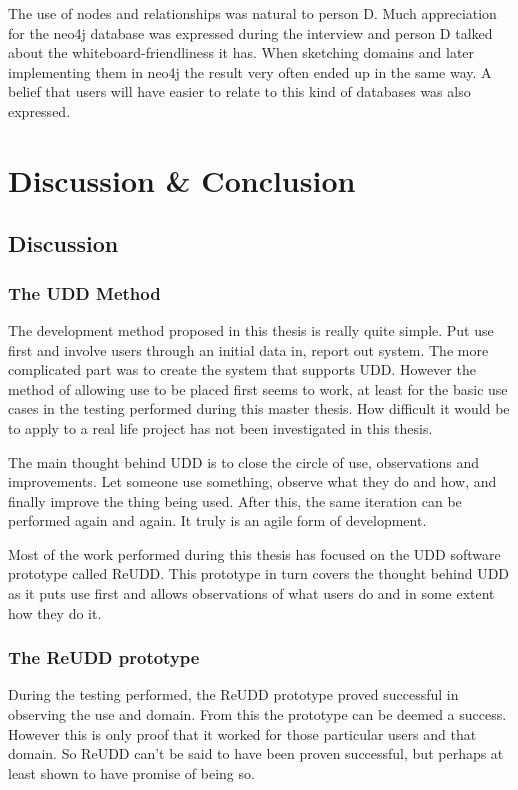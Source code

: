 \documentclass[a4paper]{report}
\begin{document}
The use of nodes and relationships was natural to person D. Much appreciation for the neo4j database was expressed during the interview and person D talked about the whiteboard-friendliness it has. When sketching domains and later implementing them in neo4j the result very often ended up in the same way. A belief that users will have easier to relate to this kind of databases was also expressed.

\chapter{Discussion \& Conclusion} \label{chap:discussion-conclusion}

\section{Discussion} \label{sec:discussion}

\subsection{The UDD Method}
The development method proposed in this thesis is really quite simple. Put use first and involve users through an initial data in, report out system. The more complicated part was to create the system that supports UDD. However the method of allowing use to be placed first seems to work, at least for the basic use cases in the testing performed during this master thesis. How difficult it would be to apply to a real life project has not been investigated in this thesis.

The main thought behind UDD is to close the circle of use, observations and improvements. Let someone use something, observe what they do and how, and finally improve the thing being used. After this, the same iteration can be performed again and again. It truly is an agile form of development.

Most of the work performed during this thesis has focused on the UDD software prototype called ReUDD. This prototype in turn covers the thought behind UDD as it puts use first and allows observations of what users do and in some extent how they do it.

\subsection{The ReUDD prototype}
During the testing performed, the ReUDD prototype proved successful in observing the use and domain. From this the prototype can be deemed a success. However this is only proof that it worked for those particular users and that domain. So ReUDD can't be said to have been proven successful, but perhaps at least shown to have promise of being so.
\end{document}
